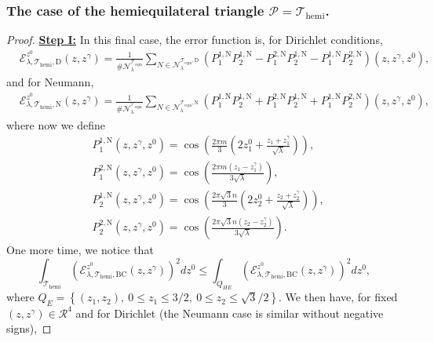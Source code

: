 \documentclass{amsart}
\theoremstyle{definition}
\theoremstyle{remark}
\renewcommand\leq\leqslant
\numberwithin{equation}{section}
\theoremstyle{definition}
\theoremstyle{remark}
\begin{document}
\subsubsection{The case of the hemiequilateral triangle $\mathcal{P}=\mathcal{T}_\mathrm{hemi}$.}
\begin{proof}
\textbf{	\underline{Step I:}}	In this final case, the error function is, for Dirichlet conditions, \begin{equation}
		\begin{aligned}
			&\mathcal{E}_{\lambda,\mathcal{T}_\mathrm{hemi},\mathrm{D}}^{z^0}(z,z^\gamma)
			=\frac{1}{\#\mathcal{N}_\lambda^{\mathcal{T}_\mathrm{equi}}}\sum_{N\in\mathcal{N}_\lambda^{\mathcal{T}_\mathrm{equi},\mathrm{D}}}\left(P^{1,\mathrm{N}}_1P^{1,\mathrm{N}}_2-P^{2,\mathrm{N}}_1P^{1,\mathrm{N}}_2-P^{1,\mathrm{N}}_1P^{2,\mathrm{N}}_2\right)(z,z^\gamma,z^0),
		\end{aligned}
	\end{equation} and for Neumann, 
	\begin{equation}
		\begin{aligned}
			&\mathcal{E}_{\lambda,\mathcal{T}_\mathrm{hemi},\mathrm{N}}^{z^0}(z,z^\gamma)
			=\frac{1}{\#\mathcal{N}_\lambda^{\mathcal{T}_\mathrm{equi}}}\sum_{N\in\mathcal{N}_\lambda^{\mathcal{T}_\mathrm{equi},\mathrm{N}}}\left(P^{1,\mathrm{N}}_1P^{1,\mathrm{N}}_2+P^{2,\mathrm{N}}_1P^{1,\mathrm{N}}_2+P^{1,\mathrm{N}}_1P^{2,\mathrm{N}}_2\right)(z,z^\gamma,z^0),
		\end{aligned}
	\end{equation}where now we define
	\begin{equation}
		\begin{aligned}
			&P_1^{1,\mathrm{N}}(z,z^\gamma,z^0)= \cos\left(\frac{2\pi m}{3}\left(2z_1^0+\frac{z_1+z_1^\gamma}{\sqrt{\lambda}}\right)\right) ,\\
			&P_1^{2,\mathrm{N}}(z,z^\gamma,z^0)= \cos\left(\frac{2\pi m\left(z_1-z_1^\gamma\right)}{3\sqrt{\lambda}}\right) ,\\
			&P_2^{1,\mathrm{N}}(z,z^\gamma,z^0)= \cos\left(\frac{2\pi\sqrt{3}n}{3}\left(2z_2^0+\frac{z_2+z_2^\gamma}{\sqrt{\lambda}}\right)\right) ,\\
			&P_2^{2,\mathrm{N}}(z,z^\gamma,z^0)=\cos\left(\frac{2\pi\sqrt{3}n\left(z_2-z_2^\gamma\right)}{3\sqrt{\lambda}}\right)  .
		\end{aligned}
	\end{equation} 
	One more time, we notice that  \begin{equation}
		\int_{\mathcal{T}_\mathrm{hemi}}\left(\mathcal{E}_{\lambda,\mathcal{T}_\mathrm{hemi},\mathrm{BC}}^{z^0}(z,z^\gamma)\right)^2dz^0\leq \int_{Q_{HE}}\left(\mathcal{E}_{\lambda,\mathcal{T}_\mathrm{hemi},\mathrm{BC}}^{z^0}(z,z^\gamma)\right)^2dz^0,
	\end{equation}where $Q_E=\left\{(z_1,z_2),\ 0\leq z_1\leq 3/2,\ 0\leq z_2\leq \sqrt{3}/2\right\}$. We then have, for fixed $(z,z^\gamma)\in\mathcal{R}^4$ and for Dirichlet (the Neumann case is similar without negative signs), 
	

\end{proof}
\end{document}
